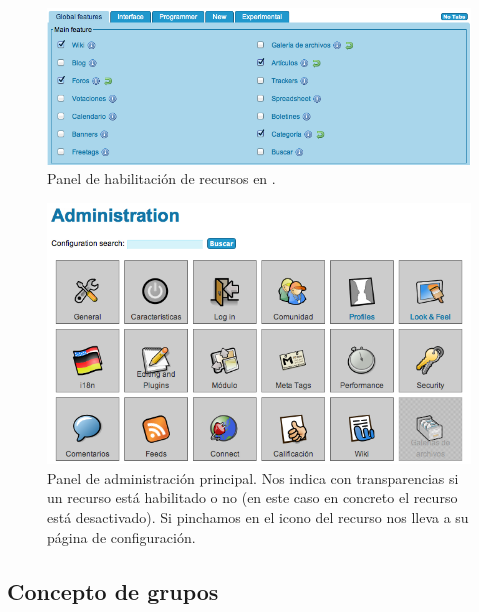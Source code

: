 \begin{figure}
\centering
\includegraphics[width=\linewidth]{../graphics/fig_panel_habilitar_recursos_tiki.png}
\caption{Panel de habilitación de recursos en \tiki{}.}\label{fig:panel_habilitar_recursos_tiki}
\end{figure}

\begin{figure}
\centering
\includegraphics[width=\linewidth]{../graphics/fig_panel_de_recursos.png}
\caption{Panel de administración principal. Nos indica con transparencias si un recurso está habilitado o no (en este caso en concreto el recurso  está desactivado). Si pinchamos en el icono del recurso nos lleva a su página de configuración.}\label{fig:panel_de_recursos}
\end{figure}

\subsection{Concepto de grupos}

